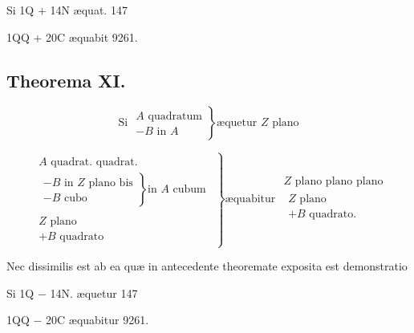 \documentclass[11pt,a4paper]{article}
\begin{document}
Si 1Q + 14N æquat. 147

1QQ + 20C æquabit 9261.


\subsection*{Theorema XI.}

\[ \text{Si } \left.\begin{array}{l} A \text{ quadratum} \\ - B \text{ in } A \end{array}\right\} \text{æquetur } Z \text{ plano} \]

\[ \left.\begin{array}{c} \begin{array}{l} A \text{ quadrat. quadrat.} \\ \left.\begin{array}{l} - B \text{ in } Z \text{ plano bis} \\ - B \text{ cubo} \end{array}\right\} \text{in } A \text{ cubum} \end{array} \\ \hline \begin{array}{l} Z \text{ plano} \\ + B \text{ quadrato} \end{array} \end{array}\right\} \text{æquabitur } \begin{array}{c} Z \text{ plano plano plano} \\ \hline \begin{array}{l} Z \text{ plano} \\ + B \text{ quadrato.} \end{array} \end{array} \]

Nec dissimilis est ab ea quæ in antecedente theoremate exposita est demonstratio

Si 1Q $-$ 14N. æquetur 147

1QQ $-$ 20C æquabitur 9261.

\end{document}
